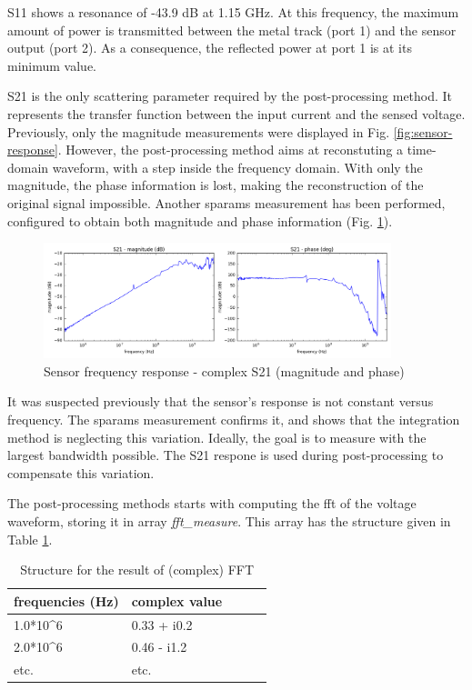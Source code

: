 S11 shows a resonance of -43.9 dB at 1.15 GHz.
At this frequency, the maximum amount of power is transmitted between the metal track (port 1) and the sensor output (port 2).
As a consequence, the reflected power at port 1 is at its minimum value.

S21 is the only scattering parameter required by the post-processing method.
It represents the transfer function between the input current and the sensed voltage.
Previously, only the magnitude measurements were displayed in Fig. \ref{fig:sensor-response}.
However, the post-processing method aims at reconstuting a time-domain waveform, with a step inside the frequency domain.
With only the magnitude, the phase information is lost, making the reconstruction of the original signal impossible.
Another \gls{sparams} measurement has been performed, configured to obtain both magnitude and phase information (Fig. \ref{fig:s21-response-complex}).

\begin{figure}[!htbp]
  \centering
  \includegraphics[width=0.9\textwidth]{src/3/figures/s21_freq_response.png}
  \caption{Sensor frequency response - complex S21 (magnitude and phase)}
  \label{fig:s21-response-complex}
\end{figure}

It was suspected previously that the sensor's response is not constant versus frequency.
The \gls{sparams} measurement confirms it, and shows that the integration method is neglecting this variation.
Ideally, the goal is to measure with the largest bandwidth possible.
The S21 respone is used during post-processing to compensate this variation.

The post-processing methods starts with computing the \gls{fft} of the voltage waveform, storing it in array \textit{fft\_measure}.
This array has the structure given in Table \ref{tab:complex-fft}.

\begin{table}[!htbp]
  \centering
  \begin{tabular}{@{}lllll@{}}
  \toprule
  frequencies (Hz)        & complex value                \\ \midrule
  1.0*10^6                & 0.33 + i0.2                  \\
  2.0*10^6                & 0.46 - i1.2                  \\
  etc.                    & etc.                         \\ \bottomrule
  \end{tabular}
  \caption{Structure for the result of (complex) FFT}
  \label{tab:complex-fft}
\end{table}

